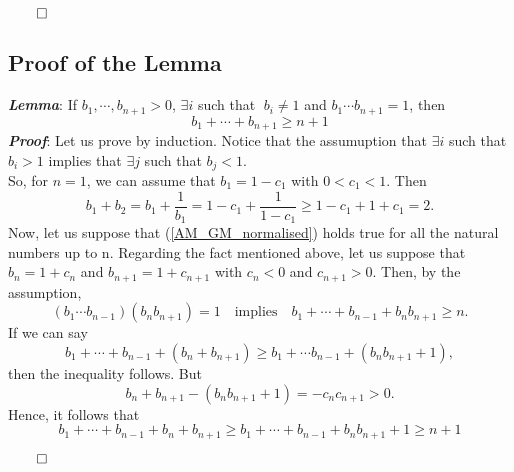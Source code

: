 \documentclass{article}
\begin{document}
\begin{right}
$\qed$
\end{right}
\subsection{Proof of the Lemma}
\label{sec-1-3}
\textbf{\emph{Lemma}}:
 If $b_1, \cdots, b_{n+1} >0$, $\exists i$ such that $\;b_i \ne 1$ and $b_1 \cdots b_{n+1} = 1$, then
\begin{equation}
\label{AM_GM_normalised}
b_1 + \cdots + b_{n+1} \ge n+1
\end{equation}
\textbf{\emph{Proof}}:
 Let us prove by induction. Notice that the assumuption that $\exists i$ such that $b_{i} > 1$ implies that $\exists j$ such that $b_{j} < 1$. \\
So, for $n=1$, we can assume that $b_1 = 1-c_1$ with $0 < c_1 <1$. Then
\begin{equation*}
\label{ }
b_1 + b_2 = b_1 + \frac{1}{b_1} = 1 - c_1 + \frac{1}{1-c_1} \ge 1-c_1 + 1 + c_1 = 2.
\end{equation*}
Now, let us suppose that (\ref{AM_GM_normalised}) holds true for all the natural numbers up to n. Regarding the fact mentioned above, let us suppose that $b_n = 1 + c_n$ and $b_{n+1} = 1+c_{n+1}$ with $c_n < 0$ and $c_{n+1} > 0$. Then, by the assumption, 
\begin{equation*}
\label{ }
(b_1 \cdots b_{n-1})(b_n b_{n+1}) = 1 \quad \text{implies} \quad b_1 + \cdots + b_{n-1} + b_n b_{n+1} \ge n.
\end{equation*}
If we can say
\begin{equation*}
\label{ }
b_1 + \cdots + b_{n-1} + (b_n + b_{n+1}) \ge b_1 + \cdots b_{n-1} + (b_n b_{n+1} + 1),
\end{equation*}
then the inequality follows. But
\begin{equation*}
\label{ }
b_n + b_{n+1} - (b_n b_{n+1} + 1) = -c_n c_{n+1} > 0.
\end{equation*}
Hence, it follows that 
\begin{equation*}
\label{ }
b_1 + \cdots + b_{n-1} + b_n + b_{n+1} \ge b_1 + \cdots + b_{n-1} + b_n b_{n+1} + 1 \ge n + 1
\end{equation*}
\begin{right}
$\qed$\\
\end{right}
\end{document}
